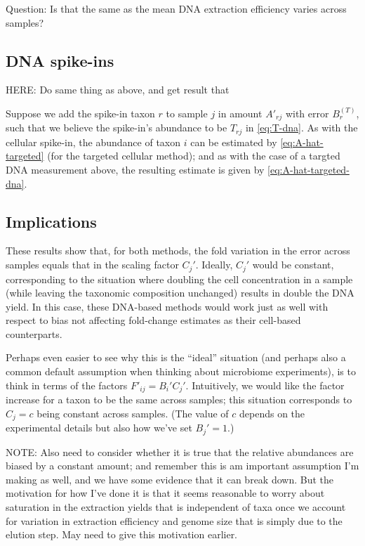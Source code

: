 \documentclass[
]{article}
\theoremstyle{definition}
\theoremstyle{definition}
\theoremstyle{definition}
\theoremstyle{definition}
\theoremstyle{remark}
\begin{document}
Question: Is that the same as the mean DNA extraction efficiency varies across samples?

\hypertarget{dna-spike-ins-1}{%
\subsection{DNA spike-ins}\label{dna-spike-ins-1}}

HERE: Do same thing as above, and get result that

Suppose we add the spike-in taxon \(r\) to sample \(j\) in amount \(A'_{rj}\) with error
\(B^{(T)}_r\), such that we believe the spike-in's abundance to be \(T_{rj}\) in \eqref{eq:T-dna}.
As with the cellular spike-in, the abundance of taxon \(i\) can be estimated by \eqref{eq:A-hat-targeted} (for the targeted cellular method);
and as with the case of a targted DNA measurement above, the resulting estimate is given by \eqref{eq:A-hat-targeted-dna}.

\hypertarget{implications}{%
\subsection{Implications}\label{implications}}

These results show that, for both methods, the fold variation in the error across samples equals that in the scaling factor \(C_j'\).
Ideally, \(C_j'\) would be constant, corresponding to the situation where doubling the cell concentration in a sample (while leaving the taxonomic composition unchanged) results in double the DNA yield.
In this case, these DNA-based methods would work just as well with respect to bias not affecting fold-change estimates as their cell-based counterparts.

Perhaps even easier to see why this is the ``ideal'' situation (and perhaps also a common default assumption when thinking about microbiome experiments), is to think in terms of the factors \(F'_{ij} = B_i' C_j'\).
Intuitively, we would like the factor increase for a taxon to be the same across samples; this situation corresponds to \(C_j = c\) being constant across samples.
(The value of \(c\) depends on the experimental details but also how we've set \(B_j' = 1\).)

NOTE: Also need to consider whether it is true that the relative abundances are biased by a constant amount; and remember this is am important assumption I'm making as well, and we have some evidence that it can break down.
But the motivation for how I've done it is that it seems reasonable to worry about saturation in the extraction yields that is independent of taxa once we account for variation in extraction efficiency and genome size that is simply due to the elution step.
May need to give this motivation earlier.
\end{document}
